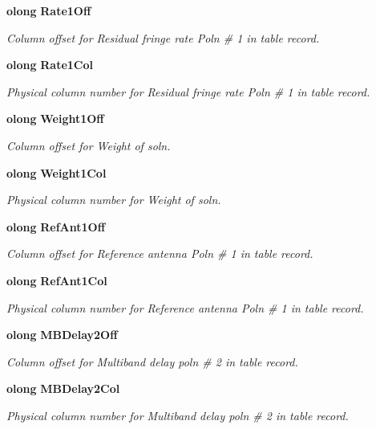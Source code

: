 \begin{CompactItemize}
{\bf olong} {\bf Rate1Off}
\begin{CompactList}\small\item\em Column offset for Residual fringe rate Poln \# 1 in table record. \item\end{CompactList}\item 
{\bf olong} {\bf Rate1Col}
\begin{CompactList}\small\item\em Physical column number for Residual fringe rate Poln \# 1 in table record. \item\end{CompactList}\item 
{\bf olong} {\bf Weight1Off}
\begin{CompactList}\small\item\em Column offset for Weight of soln. \item\end{CompactList}\item 
{\bf olong} {\bf Weight1Col}
\begin{CompactList}\small\item\em Physical column number for Weight of soln. \item\end{CompactList}\item 
{\bf olong} {\bf Ref\-Ant1Off}
\begin{CompactList}\small\item\em Column offset for Reference antenna Poln \# 1 in table record. \item\end{CompactList}\item 
{\bf olong} {\bf Ref\-Ant1Col}
\begin{CompactList}\small\item\em Physical column number for Reference antenna Poln \# 1 in table record. \item\end{CompactList}\item 
{\bf olong} {\bf MBDelay2Off}
\begin{CompactList}\small\item\em Column offset for Multiband delay poln \# 2 in table record. \item\end{CompactList}\item 
{\bf olong} {\bf MBDelay2Col}
\begin{CompactList}\small\item\em Physical column number for Multiband delay poln \# 2 in table record. \item\end{CompactList}\item 

\end{CompactItemize}
